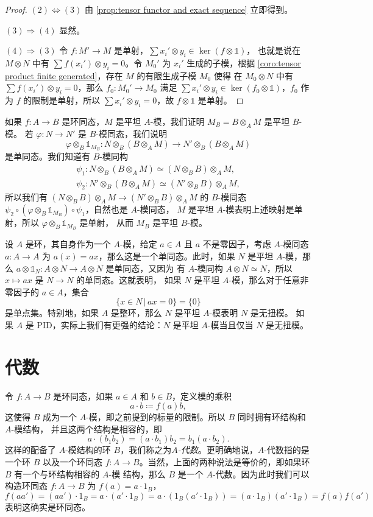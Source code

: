 \begin{proof}
  $(2)\Leftrightarrow (3)$ 由 \autoref{prop:tensor functor and exact sequence} 立即得到。

  $(3)\Rightarrow (4)$ 显然。

  $(4)\Rightarrow (3)$ 令 $f:M'\to M$ 是单射，$\sum x_i'\otimes y_i\in \ker(f\otimes \mathbb{1})$，
  也就是说在 $M\otimes N$ 中有 $\sum f(x_i')\otimes y_i=0$。令 $M_0'$ 为 $x_i'$ 生成的子模，根据
  \autoref{coro:tensor product finite generated}，存在 $M$ 的有限生成子模 $M_0$ 使得
  在 $M_0\otimes N$ 中有 $\sum f(x_i')\otimes y_i=0$，那么 $f_0:M_0'\to M_0$ 满足
  $\sum x_i'\otimes y_i\in\ker(f_0\otimes\mathbb{1})$，$f_0$ 作为 $f$ 的限制是单射，所以
  $\sum x_i'\otimes y_i=0$，故 $f\otimes\mathbb{1}$ 是单射。
\end{proof}

如果 $f:A\to B$ 是环同态，$M$ 是平坦 $A$-模，我们证明 $M_B=B\otimes_AM$ 是平坦 $B$-模。
若 $\varphi:N\to N'$ 是 $B$-模同态，我们说明
\[
  \varphi\otimes_B\mathbb{1}_{M_B}:N\otimes_B(B\otimes_AM)\to N'\otimes_B(B\otimes_AM)  
\]
是单同态。我们知道有 $B$-模同构
\begin{gather*}
  \psi_1:N\otimes_B(B\otimes_AM)\simeq (N\otimes_BB)\otimes_AM,  \\
  \psi_2:N'\otimes_B(B\otimes_AM)\simeq (N'\otimes_BB)\otimes_AM,  
\end{gather*}
所以我们有 $(N\otimes_BB)\otimes_AM\to (N'\otimes_BB)\otimes_AM$ 的 $B$-模同态
$\psi_2\circ(\varphi\otimes_B\mathbb{1}_{M_B})\circ\psi_1$，自然也是 $A$-模同态，
$M$ 是平坦 $A$-模表明上述映射是单射，所以 $\varphi\otimes_B\mathbb{1}_{M_B}$ 是单射，
从而 $M_B$ 是平坦 $B$-模。

设 $A$ 是环，其自身作为一个 $A$-模，给定 $a\in A$ 且 $a$ 不是零因子，考虑 $A$-模同态 $a:A\to A$
为 $a(x)=ax$，那么这是一个单同态。此时，如果 $N$ 是平坦 $A$-模，那么
$a\otimes\mathbb{1}_N:A\otimes N\to A\otimes N$ 是单同态，又因为
有 $A$-模同构 $A\otimes N\simeq N$，所以 $x\mapsto ax$ 是 $N\to N$ 的单同态。这就表明，
如果 $N$ 是平坦 $A$-模，那么对于任意非零因子的 $a\in A$，集合
\[
  \{x\in N\,|\, ax=0\}=\{0\}
\]
是单点集。特别地，如果 $A$ 是整环，那么 $N$ 是平坦 $A$-模表明 $N$ 是无扭模。
如果 $A$ 是 PID，实际上我们有更强的结论：$N$ 是平坦 $A$-模当且仅当 $N$ 是无扭模。

\section{代数}

令 $f:A\to B$ 是环同态，如果 $a\in A$ 和 $b\in B$，定义模的乘积
\[
  a\cdot b\coloneqq f(a)b,  
\]
这使得 $B$ 成为一个 $A$-模，即之前提到的标量的限制。所以 $B$ 同时拥有环结构和 $A$-模结构，
并且这两个结构是相容的，即
\[
  a\cdot(b_1b_2)=(a\cdot b_1)b_2=b_1(a\cdot b_2).
\]
这样的配备了 $A$-模结构的环 $B$，我们称之为\emph{$A$-代数}。更明确地说，$A$-代数指的是一个环
$B$ 以及一个环同态 $f:A\to B$。当然，上面的两种说法是等价的，即如果环 $B$ 有一个与环结构相容的 $A$-模
结构，那么 $B$ 是一个 $A$-代数。因为此时我们可以构造环同态 $f:A\to B$ 为 $f(a)=a\cdot 1_B$，
\[
  f(aa')=(aa')\cdot 1_B=a\cdot(a'\cdot 1_B)=a\cdot (1_B(a'\cdot 1_B))
  =(a\cdot 1_B)(a'\cdot 1_B)=f(a)f(a')
\]
表明这确实是环同态。

